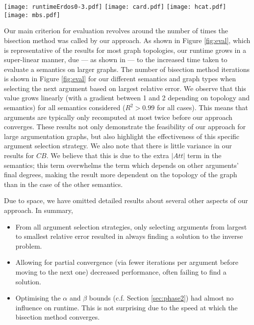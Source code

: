 \documentclass{article}
\begin{document}
\begin{figure*}
    \centering
    \texttt{[image: runtimeErdos0-3.pdf]}
    \texttt{[image: card.pdf]}
    \texttt{[image: hcat.pdf]} 
    \texttt{[image: mbs.pdf]}
    \caption{Runtime (in seconds) and number of iterations for the different semantics and graph types}
    \label{fig:eval}
\end{figure*}

Our main criterion for evaluation revolves around the number of times the bisection method was called by our approach. As shown in Figure \ref{fig:eval}, which is representative of the results for most graph topologies, our runtime grows in a super-linear manner, due --- as shown in \cite{AMGOUD2022103607} --- to the increased time taken to evaluate a semantics on larger graphs. The number of bisection method iterations is shown in Figure \ref{fig:eval} for our different semantics and graph types when selecting the next argument based on largest relative error. We observe that this value grows linearly (with a gradient between 1 and 2 depending on topology and semantics) for all semantics considered ($R^2>0.99$ for all cases). This means that arguments are typically only recomputed at most twice before our approach converges. These results not only demonstrate the feasibility of our approach for large argumentation graphs, but also highlight the effectiveness of this specific argument selection strategy. We also note that there is little variance in our results for $CB$. We believe that this is due to the extra $|Att|$ term in the semantics; this term overwhelms the term which depends on other arguments' final degrees, making the result more dependent on the topology of the graph than in the case of the other semantics.

Due to space, we have omitted detailed results about several other aspects of our approach. In summary,

\begin{itemize}
    \item From all argument selection strategies, only selecting arguments from largest to smallest relative error resulted in always finding a solution to the inverse problem.
    \item Allowing for partial convergence (via fewer iterations per argument before moving to the next one) decreased performance, often failing to find a solution.
    \item Optimising the $\alpha$ and $\beta$ bounds (c.f. Section \ref{sec:phase2}) had almost no influence on runtime. This is not  surprising due to the speed at which the bisection method converges.
\end{itemize}
\end{document}
